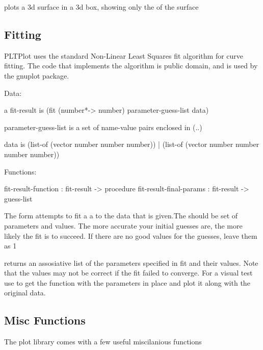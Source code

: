 \documentclass{article}
\begin{document}
{ plots a 3d surface in a 3d box, showing only the  of the surface

\subsection{Fitting}
\label{Fitting}


PLTPlot uses the standard Non-Linear Least Squares fit algorithm for curve fitting. The code that implements the algorithm is public domain, and is used by the gnuplot package.



\begin{schemedisplay}

Data:
       
a fit-result is 
  (fit (number*-> number) parameter-guess-list  data)       
  
  
parameter-guess-list is a set of name-value pairs enclosed in (..)
  
data is
  (list-of (vector number number number))
| (list-of (vector number number number number))
  
Functions:
  
  fit-result-function : fit-result -> procedure
  fit-result-final-params : fit-result -> guess-list
      
       
\end{schemedisplay}



The  form attempts to fit a a  to the data that is given.The should be set of parameters and values. The more accurate  your initial guesses are, the more likely the fit is to succeed. If there are no good values for the guesses, leave them as 1


 returns an assosiative list of the parameters specified  in fit
 and their values. Note that the values may not be correct if the fit failed to converge. 
For a visual test use  to get the function with the parameters 
in place and plot it along with the original data.

\subsection{Misc Functions}


The plot library comes with a few useful miscilanious functions


\begin{schemedisplay}


\end{schemedisplay}}
\end{document}
